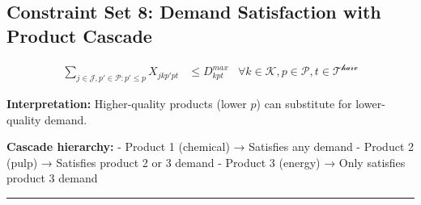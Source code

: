 \documentclass[
  11pt,
  11pt,
  a4paper]{article}
\begin{document}
\subsection{Constraint Set 8: Demand Satisfaction with Product
Cascade}\label{constraint-set-8-demand-satisfaction-with-product-cascade}

\begin{align}
\sum_{j \in \mathcal{J}, p'\in \mathcal{P}: p' \leq p } X_{jkp'pt} & \leq D^{max}_{kpt} & \forall k \in  \mathcal{K}, p \in  \mathcal{P}, t \in \mathcal{T^{harv}} \tag{C8}
\end{align}

\textbf{Interpretation:} Higher-quality products (lower \(p\)) can
substitute for lower-quality demand.

\textbf{Cascade hierarchy:} - Product 1 (chemical) → Satisfies any
demand - Product 2 (pulp) → Satisfies product 2 or 3 demand - Product 3
(energy) → Only satisfies product 3 demand

\begin{center}\rule{0.5\linewidth}{0.5pt}\end{center}
\end{document}
